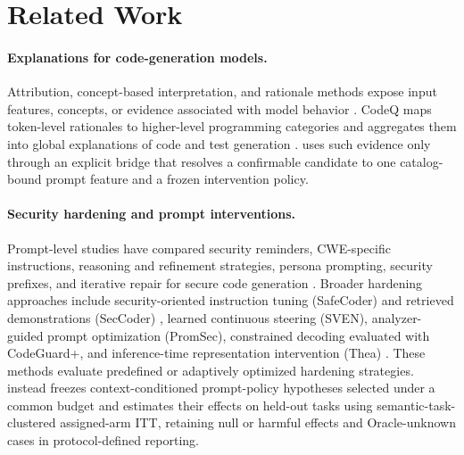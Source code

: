 \section{Related Work}

\paragraph{Explanations for code-generation models.}
Attribution, concept-based interpretation, and rationale methods expose input
features, concepts, or evidence associated with model behavior
\cite{sundararajan2017integrated,kim2018tcav,lundberg2017shap,
deyoung2020eraser}.
CodeQ maps token-level rationales to higher-level programming categories and
aggregates them into global explanations of code and test generation
\cite{khati2026codeq}.
\model uses such evidence only through an explicit bridge that resolves a
confirmable candidate to one catalog-bound prompt feature and a frozen
intervention policy.

\paragraph{Security hardening and prompt interventions.}
Prompt-level studies have compared security reminders, CWE-specific
instructions, reasoning and refinement strategies, persona prompting, security
prefixes, and iterative repair for secure code generation
\cite{tony2025prompting,bruni2025promptbenchmark}.
Broader hardening approaches include security-oriented instruction tuning
(SafeCoder) and retrieved demonstrations (SecCoder)
\cite{he2024safecoder,zhang2024seccoder}, learned continuous steering (SVEN),
analyzer-guided prompt optimization (PromSec), constrained decoding evaluated
with CodeGuard+, and inference-time representation intervention (Thea)
\cite{he2023sven,nazzal2024promsec,fu2024codeguard,
elhusseini2026thea}.
These methods evaluate predefined or adaptively optimized hardening
strategies. \model instead freezes context-conditioned prompt-policy
hypotheses selected under a common budget and estimates their effects on
held-out tasks using semantic-task-clustered assigned-arm ITT, retaining null
or harmful effects and Oracle-unknown cases in protocol-defined reporting.

